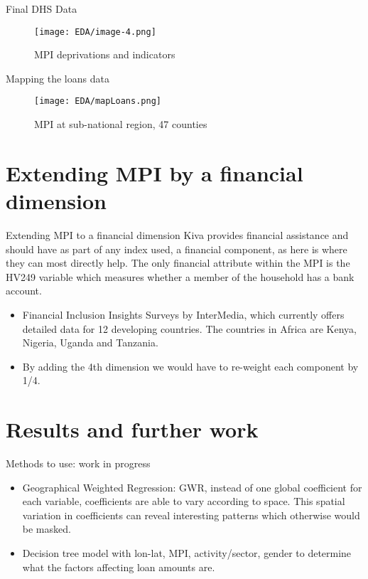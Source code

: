 \documentclass[10pt]{beamer}
\begin{document}
\begin{frame}{Final DHS Data}
\begin{figure}
    \centering
    \texttt{[image: EDA/image-4.png]}
    \caption{MPI deprivations and indicators}
\end{figure}

\end{frame}

\begin{frame}{Mapping the loans data}
\begin{figure}
    \centering
    \texttt{[image: EDA/mapLoans.png]}
    \caption{MPI at sub-national region, 47 counties}
\end{figure}

\end{frame}

\section{Extending MPI by a financial dimension}
\begin{frame}{Extending MPI to a financial dimension}
Kiva provides financial assistance and should have as part of any index used, a financial component, as here is where they can most directly help. The only financial attribute within the MPI is the HV249 variable which measures whether a member of the household has a bank account.
\begin{itemize}
    \item Financial Inclusion Insights Surveys by InterMedia, which currently offers detailed data for 12 developing countries. The countries in Africa are Kenya, Nigeria, Uganda and Tanzania.
    \item By adding the 4th dimension we would have to re-weight each component by 1/4.
\end{itemize}

    
\end{frame}
\section{Results and further work}

\begin{frame}{Methods to use: work in progress}
    \begin{itemize}
        \item Geographical Weighted Regression: GWR, instead of one global coefficient for each variable, coefficients are able to vary according to space. This spatial variation in coefficients can reveal interesting patterns which otherwise would be masked.
        \item Decision tree model with lon-lat, MPI, activity/sector, gender to determine what the factors affecting loan amounts are. 
    \end{itemize}
\end{frame}
\end{document}
